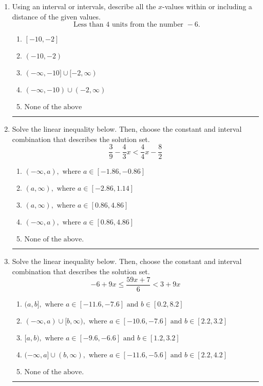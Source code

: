 \documentclass[14pt]{extbook}
\newcommand{\litem}[1]{\item#1\hspace*{-1cm}\rule{\textwidth}{0.4pt}}
\begin{document}
\begin{enumerate}
{\begin{enumerate}[label=\Alph*.]
\end{enumerate} }
\litem{
Using an interval or intervals, describe all the $x$-values within or including a distance of the given values.\[ \text{ Less than } 4 \text{ units from the number } -6. \]\begin{enumerate}[label=\Alph*.]
\item \( [-10, -2] \)
\item \( (-10, -2) \)
\item \( (-\infty, -10] \cup [-2, \infty) \)
\item \( (-\infty, -10) \cup (-2, \infty) \)
\item \( \text{None of the above} \)

\end{enumerate} }
\litem{
Solve the linear inequality below. Then, choose the constant and interval combination that describes the solution set.\[ \frac{3}{9} - \frac{4}{3} x < \frac{4}{4} x - \frac{8}{2} \]\begin{enumerate}[label=\Alph*.]
\item \( (-\infty, a), \text{ where } a \in [-1.86, -0.86] \)
\item \( (a, \infty), \text{ where } a \in [-2.86, 1.14] \)
\item \( (a, \infty), \text{ where } a \in [0.86, 4.86] \)
\item \( (-\infty, a), \text{ where } a \in [0.86, 4.86] \)
\item \( \text{None of the above}. \)

\end{enumerate} }
\litem{
Solve the linear inequality below. Then, choose the constant and interval combination that describes the solution set.\[ -6 + 9 x \leq \frac{59 x + 7}{6} < 3 + 9 x \]\begin{enumerate}[label=\Alph*.]
\item \( (a, b], \text{ where } a \in [-11.6, -7.6] \text{ and } b \in [0.2, 8.2] \)
\item \( (-\infty, a) \cup [b, \infty), \text{ where } a \in [-10.6, -7.6] \text{ and } b \in [2.2, 3.2] \)
\item \( [a, b), \text{ where } a \in [-9.6, -6.6] \text{ and } b \in [1.2, 3.2] \)
\item \( (-\infty, a] \cup (b, \infty), \text{ where } a \in [-11.6, -5.6] \text{ and } b \in [2.2, 4.2] \)
\item \( \text{None of the above.} \)


\end{enumerate}}
\end{enumerate}
\end{document}
